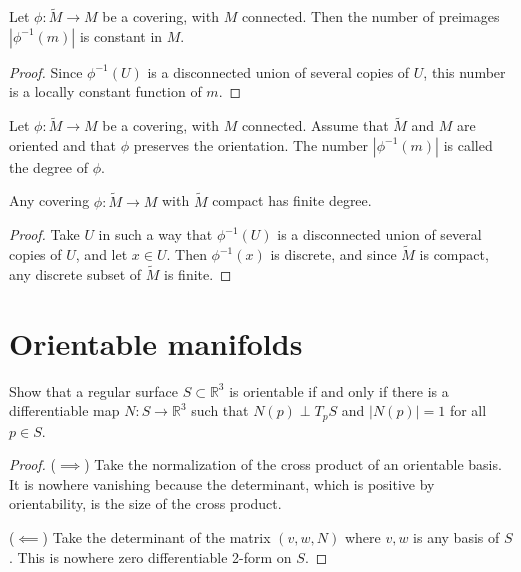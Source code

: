 \begin{lemma}
\label{lemma-covering-constant-fiber-size}
Let $\phi:\tilde{M}\to M$ be a covering,
with $M$ connected. Then the number of
preimages $|\phi^{-1}(m)|$ is constant in
$M$.
\end{lemma}

\begin{proof}
Since $\phi^{-1}(U)$ is a disconnected union
of several copies of $U$, this number is a
locally constant function of $m$.
\end{proof}

\begin{definition}
\label{definition-degree-covering}
Let $\phi:\tilde{M}\to M$ be a covering,
with $M$ connected. Assume that $\tilde{M}$
and $M$ are oriented and that $\phi$
preserves the orientation. The number
$|\phi^{-1}(m)|$ is called the degree of
$\phi$.
\end{definition}

\begin{lemma}
\label{lemma-compact-covering-finite-degree}
Any covering $\phi:\tilde{M}\to M$ with
$\tilde{M}$ compact has finite degree.
\end{lemma}

\begin{proof}
Take $U$ in such a way that
$\phi^{-1}(U)$ is a disconnected union of
several copies of $U$, and let $x \in U$.
Then $\phi^{-1}(x)$ is discrete, and since
$\tilde{M}$ is compact, any discrete subset
of $\tilde{M}$ is finite.
\end{proof}

\section{Orientable manifolds}
\label{section-orientable-manifolds}

\begin{exercise}
\label{exercise-orientable-surfaces}
Show that a regular surface $S \subset
\mathbb{R}^3$
is orientable if and only if there is a
differentiable
map $N:S \to \mathbb{R}^3$ such that
$N(p)\perp T_pS$
and $|N(p)|=1$ for all $p \in S$.
\end{exercise}

\begin{proof}
($\implies$) Take the normalization of the
cross product of an orientable basis.
It is nowhere vanishing because the
determinant,
which is positive by orientability,
is the size of the cross product.

($\impliedby$) Take the determinant of the
matrix $(v,w,N)$
where $v,w$ is any basis of $S$.
This is nowhere zero differentiable 2-form on
$S$.
\end{proof}

